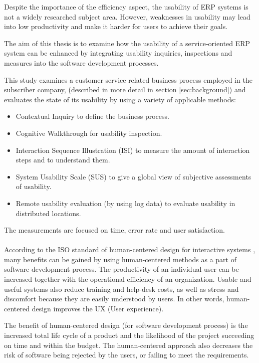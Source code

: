 \documentclass[12pt,a4paper,oneside,pdftex]{report}
\begin{document}
Despite the importance of the efficiency aspect, the usability of ERP systems is not a widely researched subject area. However, weaknesses in usability may lead into low productivity and make it harder for users to achieve their goals.\cite{RefWorks:2} 

The aim of this thesis is to examine how the usability of a service-oriented ERP system can be enhanced by integrating usability inquiries, inspections and measures into the software development processes. 


This study examines a customer service related business process employed in the subscriber company, (described in more detail in section \ref{sec:background}) and evaluates the state of its usability by using a variety of applicable methods:
\begin{itemize}
\item Contextual Inquiry to define the business process.
\item Cognitive Walkthrough for usability inspection.
\item Interaction Sequence Illustration (ISI) to measure the amount of interaction steps and to understand them.
\item System Usability Scale (SUS) to give a global view of subjective assessments of usability.
\item Remote usability evaluation (by using log data) to evaluate usability in distributed locations.
\end{itemize}
The measurements are focused on time, error rate and user satisfaction.
\\
\\
\indent According to the ISO standard of human-centered design for interactive systems \cite{RefWorks:16}, many benefits can be gained by using human-centered methods as a part of software development process. The productivity of an individual user can be increased together with the operational efficiency of an organization. Usable and useful systems also reduce training and help-desk costs, as well as stress and discomfort because they are easily understood by users. In other words, human-centered design improves the UX (User experience).

The benefit of human-centered design (for software development process) is the increased total life cycle of a product and the likelihood of the project succeeding on time and within the budget. The human-centered approach also decreases the risk of software being rejected by the users, or failing to meet the requirements. \cite{RefWorks:16}
\end{document}
